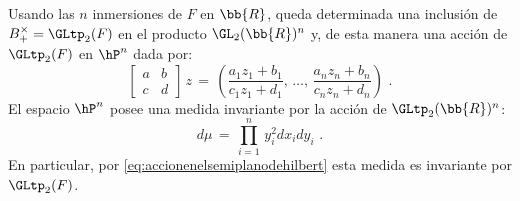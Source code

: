 
Usando las $n$ inmersiones de $F$ en $\bb{R}$, queda determinada una
inclusi\'{o}n de $B_{+}^{\times}=\GLtp_{2}(F)$ en el producto
$\GL_{2}(\bb{R})^{n}$ y, de esta manera una acci\'{o}n de $\GLtp_{2}(F)$
en $\hP^{n}$ dada por:
\begin{equation}
	\label{eq:accionenelsemiplanodehilbert}
	\begin{bmatrix} a & b \\ c & d \end{bmatrix}\,z
		\,=\, \left(
		\frac{a_{1}z_{1}+b_{1}}{c_{1}z_{1}+d_{1}},\,\dots,\,
		\frac{a_{n}z_{n}+b_{n}}{c_{n}z_{n}+d_{n}}
		\right)
	\text{ .}
\end{equation}
%
El espacio $\hP^{n}$ posee una medida invariante por la acci\'{o}n de
$\GLtp_{2}(\bb{R})^{n}$:
\begin{equation}
	\label{eq:medidaenelsemiplanodehilbert}
	d\mu \,=\, \prod_{i=1}^{n}\,y_{i}^{2}dx_{i}dy_{i}
	\text{ .}
\end{equation}
%
En particular, por \eqref{eq:accionenelsemiplanodehilbert} esta medida es
invariante por $\GLtp_{2}(F)$.

